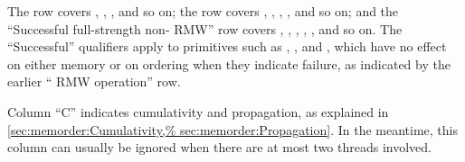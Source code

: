 The  row covers ,
, , and so on; the 
row covers , ,
, , and so on; and
the ``Successful full-strength non- RMW'' row covers
, , ,
, , and so on.
The ``Successful'' qualifiers apply to primitives such as
, , and ,
which have no effect on either memory or on ordering when they indicate
failure, as indicated by the earlier `` RMW operation'' row.

Column ``C'' indicates cumulativity and propagation, as explained in
\cref{sec:memorder:Cumulativity,%
sec:memorder:Propagation}.
In the meantime, this column can usually be ignored when there
are at most two threads involved.

